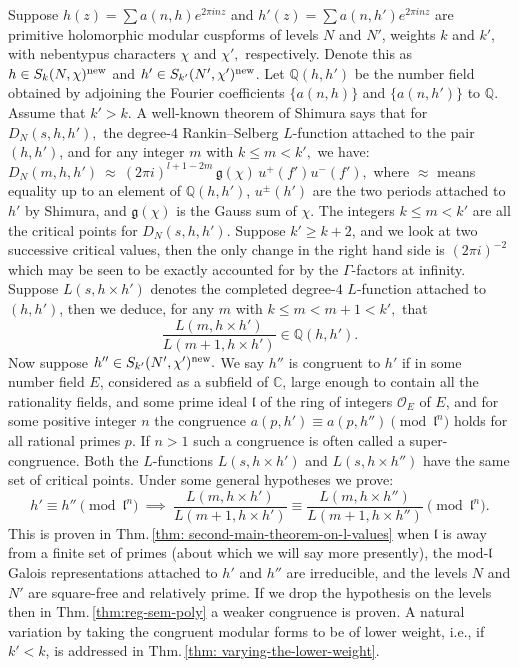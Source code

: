 \documentclass[11pt]{amsart}
\newcommand{\Q}{\mathbb Q}
\newcommand{\C}{\mathbb C}
\newcommand{\cO}{\mathcal O}
\newcommand{\fl}{\mathfrak l}
\begin{document}
Suppose $h(z) = \sum a(n,h) e^{2\pi i nz}$ 
and $h'(z) = \sum a(n,h') e^{2\pi i nz}$ are primitive holomorphic modular cuspforms of levels $N$ and $N'$,  weights 
$k$ and $k'$, with nebentypus characters $\chi$ and $\chi',$ respectively. Denote this as 
$h \in S_k(N,\chi)^{\textup{new}}$ and $h' \in S_{k'}(N',\chi')^{\textup{new}}$.
Let $\Q(h,h')$ be the number field obtained by adjoining the Fourier coefficients $\{a(n,h)\}$ and $\{a(n,h')\}$ to $\Q.$ 
Assume that $k' > k.$ A well-known theorem of Shimura \cite{shimura-periods} says that for 
$D_N(s, h, h'),$ the degree-$4$ Rankin--Selberg $L$-function attached to the pair $(h, h')$, and for any integer $m$ with 
$k \leq m < k',$ we have: 
$D_N(m,h,h') \ \approx \ (2\pi i)^{l+1-2m} \, \mathfrak{g}(\chi) \, u^+(f')u^-(f'),$
where $\approx$ means equality up to an element of $\Q(h, h')$, $u^\pm(h')$ are the two periods attached to $h'$ by Shimura, and 
$\mathfrak{g}(\chi)$ is the Gauss sum of $\chi.$ 
The integers $k \leq m < k'$ are all the critical points for $D_N(s, h ,h').$ 
Suppose $k' \geq k+2$, and we look at two successive critical values, then the only change in the right hand side is 
$(2\pi i)^{-2}$ which may be seen to be exactly accounted for 
by the $\Gamma$-factors at infinity. Suppose $L(s, h \times h')$ denotes the completed degree-$4$ $L$-function attached to $(h,h')$, 
then we deduce, for any $m$ with $k \leq m < m+1 < k',$ that  
$$
\frac{L(m, h \times h')}{L(m+1, h \times h')} \in \Q(h, h'). 
$$
Now suppose $h'' \in S_{k'}(N',\chi')^{\textup{new}}.$ We say $h''$ is congruent to $h'$ 
if in some number field $E$, considered as a subfield of $\C$, large enough to contain all the rationality fields, 
and some prime ideal $\fl$ of the ring of integers $\cO_E$ of $E$, and for some positive integer $n$ 
the congruence $a(p,h') \equiv a(p,h'') \pmod{\fl^n}$ holds for all rational primes $p$. If $n > 1$ such a congruence is often called a super-congruence. 
Both the $L$-functions $L(s, h \times h')$ and $L(s, h \times h'')$ have the same set of critical points. 
Under some general hypotheses we prove:
\begin{equation}
	h' \equiv h'' \pmod{\mathfrak{l}^n} \ \implies \ 
	\frac{L(m,h \times h')}{L(m+1, h\times h')} \equiv \frac{L(m, h \times h'')}{L(m+1, h\times h'')} \pmod{\mathfrak{l}^n}. 
\end{equation}
This is proven in Thm.\,\ref{thm: second-main-theorem-on-l-values} 
when $\fl$ is away from a finite set of primes (about which we will say more presently),  
the mod-$\fl$ Galois representations attached to $h'$ and $h''$ are irreducible, 
and the levels $N$ and $N'$ are square-free and relatively prime. 
If we drop the hypothesis on the levels then in Thm.\,\ref{thm:reg-sem-poly} a weaker congruence is proven. 
A natural variation by taking the congruent modular forms to be of lower weight, i.e., if $k' < k$, is addressed in Thm.\,\ref{thm: varying-the-lower-weight}.
\end{document}
